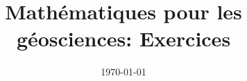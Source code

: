 \documentclass[a4,11pt]{book}
\begin{document}
\title{\vspace{-2cm}
\bf{Mathématiques pour les géosciences: Exercices} }
\date{\today}
\maketitle 
\thispagestyle{empty}


\hfill
\hfill



\tableofcontents

\hfill
\hfill

\newpage





 





 
\nocite{*}

\printbibliography
%
%
\end{document}
